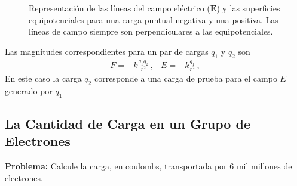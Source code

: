 \documentclass[11pt,a4paper]{book}
\begin{document}
\begin{figure}[h!]
\begin{minipage}{0.48\textwidth}
        \caption*{b) Carga Positiva: Las líneas de campo apuntan radialmente hacia afuera.}
    \end{minipage}
    
    \caption{Representación de las líneas del campo eléctrico ($\boldsymbol{E}$) y las superficies equipotenciales para una carga puntual negativa y una positiva. Las líneas de campo siempre son perpendiculares a las equipotenciales.}
    \label{fig:campos_electricos}
\end{figure}



Las magnitudes correspondientes para un par de cargas $q_1$ y $q_2$ son
\begin{align}
    F =& k\frac{q_1q_2}{r^2}\,,& E=& k\frac{q_1}{r^2} \,,
\end{align}
En este caso la carga $q_2$ corresponde a una carga de prueba para el  campo $E$ generado por $q_1$

\subsection{La Cantidad de Carga en un Grupo de Electrones}




\begin{examplebox}
    \textbf{Problema:} Calcule la carga, en coulombs, transportada por 6 mil millones de electrones.
\end{examplebox}

\vspace{5mm}
\end{document}
